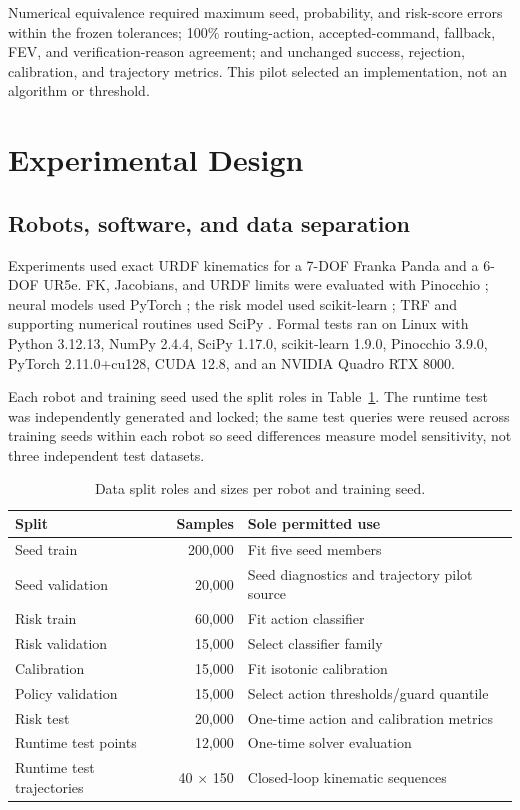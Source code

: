 \documentclass[10pt,a4paper]{article}
\begin{document}
Numerical equivalence required maximum seed, probability, and risk-score errors within
the frozen tolerances; 100\% routing-action, accepted-command, fallback, FEV, and
verification-reason agreement; and unchanged success, rejection, calibration, and
trajectory metrics. This pilot selected an implementation, not an algorithm or
threshold.

\section{Experimental Design}

\subsection{Robots, software, and data separation}

Experiments used exact URDF kinematics for a 7-DOF Franka Panda and a 6-DOF UR5e. FK,
Jacobians, and URDF limits were evaluated with Pinocchio
\cite{carpentier2019pinocchio}; neural models used PyTorch \cite{paszke2019pytorch};
the risk model used scikit-learn \cite{pedregosa2011sklearn}; TRF and supporting
numerical routines used SciPy \cite{virtanen2020scipy}. Formal tests ran on Linux with
Python 3.12.13, NumPy 2.4.4, SciPy 1.17.0, scikit-learn 1.9.0, Pinocchio 3.9.0,
PyTorch 2.11.0+cu128, CUDA 12.8, and an NVIDIA Quadro RTX 8000.

Each robot and training seed used the split roles in Table~\ref{tab:splits}. The
runtime test was independently generated and locked; the same test queries were reused
across training seeds within each robot so seed differences measure model sensitivity,
not three independent test datasets.

\begin{table}[H]
\centering
\caption{Data split roles and sizes per robot and training seed.}
\label{tab:splits}
\begin{tabular}{lrl}
\toprule
Split & Samples & Sole permitted use \\
\midrule
Seed train & 200,000 & Fit five seed members \\
Seed validation & 20,000 & Seed diagnostics and trajectory pilot source \\
Risk train & 60,000 & Fit action classifier \\
Risk validation & 15,000 & Select classifier family \\
Calibration & 15,000 & Fit isotonic calibration \\
Policy validation & 15,000 & Select action thresholds/guard quantile \\
Risk test & 20,000 & One-time action and calibration metrics \\
Runtime test points & 12,000 & One-time solver evaluation \\
Runtime test trajectories & 40 $\times$ 150 & Closed-loop kinematic sequences \\
\bottomrule
\end{tabular}
\end{table}
\end{document}
